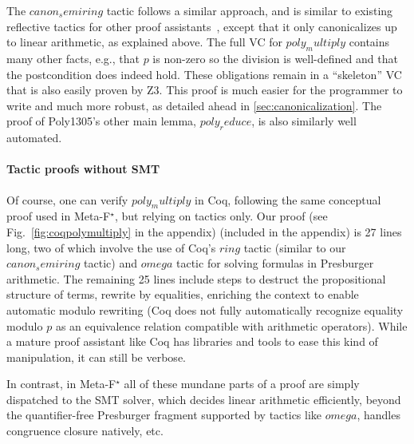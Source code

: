 \documentclass[runningheads]{llncs}
\newcommand\metafstar{Meta-F$^\star$\xspace}
\newcommand{\comm}[3]{\ifcheckpagebudget\else\ifdraft{{\color{#1}[#2: #3]}}\fi\fi}
\newcommand{\ch}[1]{\comm{teal}{CH}{#1}}
\newcommand{\guido}[1]{\comm{blue}{Guido}{#1}}
\begin{document}
%
%
The \ls$canon_semiring$ tactic follows a similar approach,
and is similar to existing reflective
tactics for other proof assistants~\cite{ring, GregoireM05},
except that it only canonicalizes up to linear arithmetic,
as explained above.
%
% 
The full VC for \ls$poly_multiply$
contains many other facts, e.g.,
that \ls$p$ is non-zero so the division is well-defined
and that the postcondition does indeed hold.
%
These obligations remain in a ``skeleton'' VC that is also easily proven
by Z3.
%
This proof is much easier for the programmer to write and much more
robust, as detailed ahead in \autoref{sec:canonicalization}.
%
The proof of Poly1305's other main lemma, \ls$poly_reduce$, is also
similarly well automated.

\paragraph{\bf Tactic proofs without SMT}

Of course, one can verify
\ls$poly_multiply$ in Coq, following the same conceptual proof used in \metafstar,
but relying on tactics only.
%
Our proof
\iffull
(see Fig.~\ref{fig:coqpolymultiply} in the appendix)
\else
(included in the appendix)
\fi
is 27 lines long, two of which involve the use of Coq's \ls$ring$
tactic (similar to our \ls$canon_semiring$ tactic) and \ls$omega$ tactic
for solving formulas in Presburger arithmetic. 
%
The remaining 25 lines include steps to destruct the
propositional structure of terms, rewrite by equalities, enriching the
context to enable automatic modulo rewriting (Coq does not fully
automatically recognize equality modulo $p$ as an equivalence relation
compatible with arithmetic operators).
%
While a mature proof assistant like Coq has libraries and tools to
ease this kind of manipulation, it can still be
verbose.

In contrast, in \metafstar{} all of these mundane parts of a proof are
simply dispatched to the SMT solver, which decides
linear arithmetic efficiently, beyond the quantifier-free Presburger fragment
supported by tactics like \ls$omega$, handles congruence closure natively, etc.
%
\end{document}

